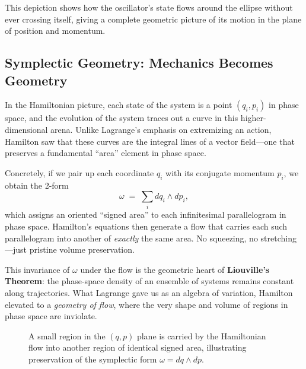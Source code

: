 This depiction shows how the oscillator’s state flows around the ellipse without ever crossing itself, giving a complete geometric picture of its motion in the plane of position and momentum.  











\subsection{Symplectic Geometry: Mechanics Becomes Geometry}

In the Hamiltonian picture, each state of the system is a point \((q_i,p_i)\) in phase space, and the evolution of the system traces out a curve in this higher-dimensional arena.  Unlike Lagrange’s emphasis on extremizing an action, Hamilton saw that these curves are the integral lines of a vector field—one that preserves a fundamental “area” element in phase space.

Concretely, if we pair up each coordinate \(q_i\) with its conjugate momentum \(p_i\), we obtain the 2-form
\[
\omega \;=\;\sum_i dq_i\wedge dp_i,
\]
which assigns an oriented “signed area” to each infinitesimal parallelogram in phase space.  Hamilton’s equations then generate a flow that carries each such parallelogram into another of \emph{exactly} the same area.  No squeezing, no stretching—just pristine volume preservation.

This invariance of \(\omega\) under the flow is the geometric heart of \textbf{Liouville’s Theorem}: the phase-space density of an ensemble of systems remains constant along trajectories.  What Lagrange gave us as an algebra of variation, Hamilton elevated to a \emph{geometry of flow}, where the very shape and volume of regions in phase space are inviolate.

\begin{figure}[H]
\centering
{}
\caption{A small region in the \((q,p)\) plane is carried by the Hamiltonian flow into another region of identical signed area, illustrating preservation of the symplectic form \(\omega=dq\wedge dp\).}
\end{figure}

